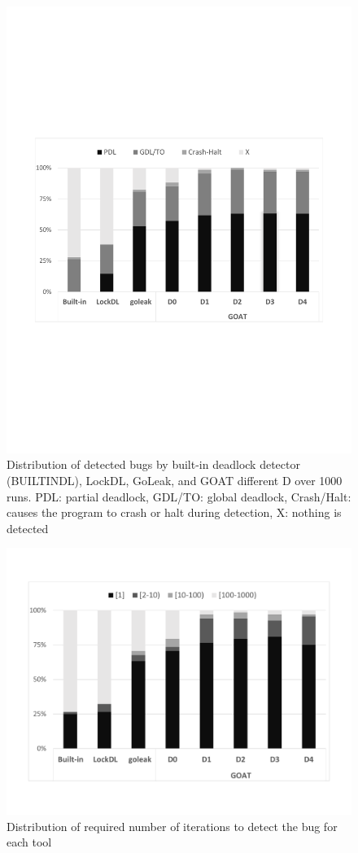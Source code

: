 \begin{figure}
\centering
  \includegraphics[width=.95\linewidth]{figs/P4_detections.pdf}
  \caption{Distribution of detected bugs by built-in deadlock detector (BUILTINDL), LockDL, GoLeak, and GOAT different D over 1000 runs. PDL: partial deadlock, GDL/TO: global deadlock, Crash/Halt: causes the program to crash or halt during detection, X: nothing is detected }
  \label{fig:detection}
\end{figure}


\begin{figure}
\centering
  \includegraphics[width=.95\linewidth]{figs/P4_runs.pdf}
  \caption{Distribution of required number of iterations to detect the bug for each tool}
  \label{fig:runs}
\end{figure}
